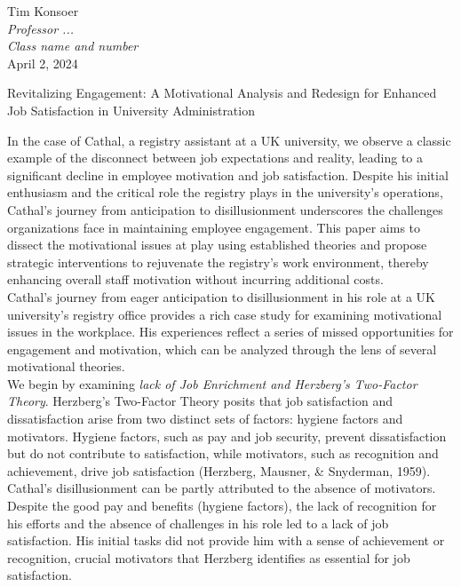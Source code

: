 \documentclass[12pt]{article}
\begin{document}
\begin{flushleft}

Tim Konsoer\\
\textit{Professor ...}\\
\textit{Class name and number}\\
April 2, 2024\\


\begin{center}
Revitalizing Engagement: A Motivational Analysis and Redesign for Enhanced Job Satisfaction in University Administration
\end{center}


\setlength{\parindent}{0.5in}


In the case of Cathal, a registry assistant at a UK university, we observe a classic example of the disconnect between job expectations and reality, leading to a significant decline in employee motivation and job satisfaction. Despite his initial enthusiasm and the critical role the registry plays in the university's operations, Cathal's journey from anticipation to disillusionment underscores the challenges organizations face in maintaining employee engagement. This paper aims to dissect the motivational issues at play using established theories and propose strategic interventions to rejuvenate the registry's work environment, thereby enhancing overall staff motivation without incurring additional costs.\\
Cathal's journey from eager anticipation to disillusionment in his role at a UK university's registry office provides a rich case study for examining motivational issues in the workplace. His experiences reflect a series of missed opportunities for engagement and motivation, which can be analyzed through the lens of several motivational theories.\\
We begin by examining \textit{lack of Job Enrichment and Herzberg's Two-Factor Theory}. Herzberg's Two-Factor Theory posits that job satisfaction and dissatisfaction arise from two distinct sets of factors: hygiene factors and motivators. Hygiene factors, such as pay and job security, prevent dissatisfaction but do not contribute to satisfaction, while motivators, such as recognition and achievement, drive job satisfaction (Herzberg, Mausner, & Snyderman, 1959). Cathal's disillusionment can be partly attributed to the absence of motivators. Despite the good pay and benefits (hygiene factors), the lack of recognition for his efforts and the absence of challenges in his role led to a lack of job satisfaction. His initial tasks did not provide him with a sense of achievement or recognition, crucial motivators that Herzberg identifies as essential for job satisfaction. 

\end{flushleft}
\end{document}
